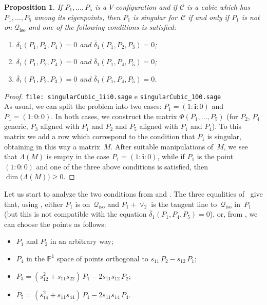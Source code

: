 \documentclass{amsart}
\theoremstyle{plain}
\newtheorem{prop}[lemma]{Proposition}
\theoremstyle{definition}
\newcommand{\p}{\mathbb{P}}
\newcommand{\iso}{\mathcal{Q}_{\mathrm{iso}}}
\newcommand{\iii}{\textbf{i}}
\begin{document}
\begin{prop}
\label{proposition:P1_sing}
If $P_1, \dots, P_5$ is a $V$-configuration and if
$\mathcal{C}$ is a cubic which
has $P_1, \dots, P_5$ among its eigenpoints, then $P_1$ is
singular for~$\mathcal{C}$ if
and only if $P_1$ is not on $\iso$ and one of the following conditions
is satisfied:
%
\begin{enumerate}
  \item $\delta_1(P_1, P_2, P_4) = 0$ and $\overline{\delta}_1(P_1, P_2, P_3) = 0$;
  \item $\delta_1(P_1, P_2, P_4) = 0$ and $\overline{\delta}_1(P_1, P_4, P_5) = 0$;
  \item $\overline{\delta}_1(P_1, P_2, P_3) = 0$ and
  $\overline{\delta}_1(P_1, P_4, P_5) = 0$.
\end{enumerate}
%
\end{prop}
\begin{proof}
\verb+file: singularCubic_1ii0.sage+ e \verb+singularCubic_100.sage+\\
As usual, we can split the problem into two cases: $P_1 = (1: \iii: 0)$
and $P_1 = (1: 0: 0)$. In both cases, we construct the matrix
$\Phi(P_1, \dots, P_5)$ (for $P_2$, $P_4$ generic, $P_3$ aligned with
$P_1$ and $P_2$ and $P_5$ aligned with $P_1$ and $P_4$). To this matrix we add
a row which correspond to the condition that $P_1$ is singular, obtaining
in this way a matrix~$M$. After
suitable manipulations of~$M$, we see that $\Lambda(M)$ is empty
in the case $P_1=(1: \iii: 0)$, while if $P_1$ is the point~$(1:0:0)$
and one of the three above conditions is satisfied, then
$\dim \bigl( \Lambda(M) \bigr) \geq 0$.
\end{proof}

Let us start to analyze the two conditions from  and .
The three equalities of~ give that,
using , either $P_1$ is on~$\iso$ and
$P_1+ \vee _2$ is the tangent line to~$\iso$ in~$P_1$ (but this is not compatible
with the equation $\overline{\delta}_1(P_1, P_4, P_5)=0$), or,
from , we can choose the points as follows:
%
\begin{itemize}
  \item $P_1$ and $P_2$ in an arbitrary way;
  \item $P_4$ in the $\p^1$
  space of points orthogonal to $s_{11} \, P_2 - s_{12} \, P_1$;
  \item $P_3 = (s_{12}^2+s_{11}s_{22}) \, P_1 - 2s_{11}s_{12} \, P_2$;
  \item $P_5 = (s_{14}^2+s_{11}s_{44}) \, P_1 - 2s_{11}s_{14} \, P_4$.
\end{itemize}
%
\end{document}
